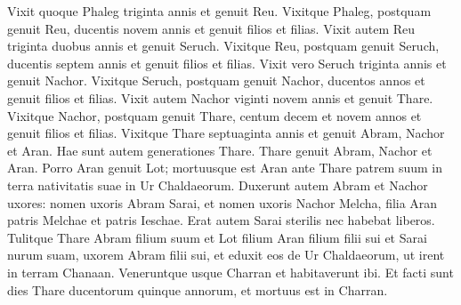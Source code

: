 \begin{biblechapter}
\begin{biblechapter}
\begin{biblechapter}
\begin{biblechapter}
\begin{biblechapter}
\begin{biblechapter}
\begin{biblechapter}
\begin{biblechapter}
\begin{biblechapter}
\begin{biblechapter}
\begin{biblechapter}
\verse Vixit quoque Phaleg triginta annis et genuit Reu. 
\verse Vixitque Phaleg, postquam genuit Reu, ducentis novem annis et genuit filios et filias.
 \verse Vixit autem Reu triginta duobus annis et genuit Seruch. 
\verse Vixitque Reu, postquam genuit Seruch, ducentis septem annis et genuit filios et filias.
 \verse Vixit vero Seruch triginta annis et genuit Nachor. 
\verse Vixitque Seruch, postquam genuit Nachor, ducentos annos et genuit filios et filias.
 \verse Vixit autem Nachor viginti novem annis et genuit Thare. 
\verse Vixitque Nachor, postquam genuit Thare, centum decem et novem annos et genuit filios et filias.
 \verse Vixitque Thare septuaginta annis et genuit Abram, Nachor et Aran. 
\verse Hae sunt autem generationes Thare. Thare genuit Abram, Nachor et Aran. Porro Aran genuit Lot; 
\verse mortuusque est Aran ante Thare patrem suum in terra nativitatis suae in Ur Chaldaeorum. 
\verse Duxerunt autem Abram et Nachor uxores: nomen uxoris Abram Sarai, et nomen uxoris Nachor Melcha, filia Aran patris Melchae et patris Ieschae. 
\verse Erat autem Sarai sterilis nec habebat liberos. 
\verse Tulitque Thare Abram filium suum et Lot filium Aran filium filii sui et Sarai nurum suam, uxorem Abram filii sui, et eduxit eos de Ur Chaldaeorum, ut irent in terram Chanaan. Veneruntque usque Charran et habitaverunt ibi. 
\verse Et facti sunt dies Thare ducentorum quinque annorum, et mortuus est in Charran.
 

\end{biblechapter}
\end{biblechapter}
\end{biblechapter}
\end{biblechapter}
\end{biblechapter}
\end{biblechapter}
\end{biblechapter}
\end{biblechapter}
\end{biblechapter}
\end{biblechapter}
\end{biblechapter}
